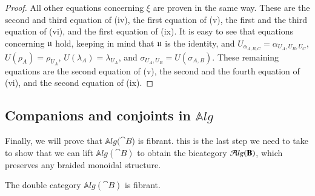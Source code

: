 \documentclass{amsart}
\newcommand{\Alg}{\mathbb{A}\mathit{lg}}
\begin{document}
\begin{proof}
All other equations concerning $\xi$ are proven in the same way. These are the second and third equation of (iv), the first equation of (v), the first and the third equation of (vi), and the first equation of (ix).
It is easy to see that equations concerning $\mathfrak{u}$ hold, keeping in mind that $\mathfrak{u}$ is the identity, and $U_{\alpha_{A,B,C}} = \alpha_{U_A,U_B,U_C}$, $U(\rho_A) = \rho_{U_A}$, $U(\lambda_A) = \lambda_{U_A}$, and $\sigma_{U_A,U_B} = U(\sigma_{A,B})$.
These remaining equations are the second equation of (v), the second and the fourth equation of (vi), and the second equation of (ix).
\end{proof}

\subsection{Companions and conjoints in $\Alg$}\label{sec:fibDalg}
Finally, we will prove that $\Alg(\cat B$) is fibrant. this is the last step we need to take to show that we can lift $\Alg({\cat B})$ to obtain the bicategory ${\mathcal{A}}lg({\mathbf{B}})$, which preserves any braided monoidal structure.

\begin{lem}\label{lem:algfib}
The double category $\Alg({\cat B})$ is fibrant.
\end{lem}
\end{document}
